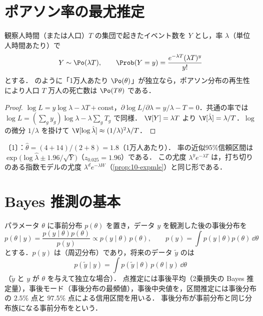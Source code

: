 \section{ポアソン率の最尤推定}\label{sec:17-poisson}
観察人時間（または人口）$T$ の集団で起きたイベント数を $Y$ とし，率 $\lambda$（単位人時間あたり）で
\[
Y\sim\Po(\lambda T),\qquad \Prob(Y=y)=\frac{e^{-\lambda T}(\lambda T)^y}{y!}
\]
とする． のように「1万人あたり $\Po(\theta)$」が独立なら，ポアソン分布の再生性により人口 $T$ 万人の死亡数は $\Po(T\theta)$ である．
\begin{proof}
$\log L=y\log\lambda-\lambda T+\text{const}$，$\partial\log L/\partial\lambda=y/\lambda-T=0$．共通の率では $\log L=(\sum_g y_g)\log\lambda-\lambda\sum_g T_g$ で同様．
$\V[Y]=\lambda T$ より $\V[\hat\lambda]=\lambda/T$．$\log$ の微分 $1/\lambda$ を掛けて $\V[\log\hat\lambda]\approx(1/\lambda)^2\lambda/T$．
\end{proof}
〔1〕：$\hat\theta=(4+14)/(2+8)=1.8$（1万人あたり）．
率の近似95\%信頼区間は $\exp\bigl(\log\hat\lambda\pm1.96/\sqrt Y\bigr)$（$z_{0.025}=1.96$）である．
この尤度 $\lambda^ye^{-\lambda T}$ は，打ち切りのある指数モデルの尤度 $\lambda^de^{-\lambda W}$（\cref{prop:10-expmle}）と同じ形である．

\section{Bayes 推測の基本}\label{sec:17-bayes}
\Hissu
パラメータ $\theta$ に事前分布 $p(\theta)$ を置き，データ $y$ を観測した後の事後分布を
\[
p(\theta\mid y)=\frac{p(y\mid\theta)p(\theta)}{p(y)}\propto p(y\mid\theta)\,p(\theta),\qquad p(y)=\int p(y\mid\theta)p(\theta)\,\dd\theta
\]
とする．$p(y)$ は（周辺分布）であり，将来のデータ $\tilde y$ のは
\[
p(\tilde y\mid y)=\int p(\tilde y\mid\theta)\,p(\theta\mid y)\,\dd\theta
\]
（$\tilde y$ と $y$ が $\theta$ を与えて独立な場合）．
点推定には事後平均（2乗損失の Bayes 推定量），事後モード（事後分布の最頻値），事後中央値を，区間推定には事後分布の $2.5\%$ 点と $97.5\%$ 点による信用区間を用いる．
事後分布が事前分布と同じ分布族になる事前分布をという．


